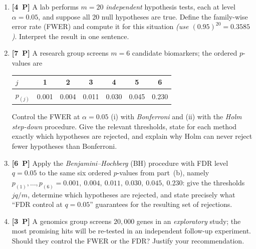 \documentclass[11pt,a4paper]{article}
\newcommand{\pp}[1]{\textbf{[#1~P]}\enspace}
\begin{document}
\begin{enumerate}[label=(\alph*),leftmargin=7mm,itemsep=2.5mm]
  \item \pp{4} A lab performs $m=20$ \emph{independent} hypothesis tests, each at level
    $\alpha=0.05$, and suppose all 20 null hypotheses are true. Define the family-wise error
    rate (FWER) and compute it for this situation
    \emph{(use $(0.95)^{20}=0.3585$)}. Interpret the result in one sentence.
  \item \pp{7} A research group screens $m=6$ candidate biomarkers; the ordered $p$-values are
    \begin{center}
    \begin{tabular}{lcccccc}
    \toprule
    $j$ & 1 & 2 & 3 & 4 & 5 & 6\\
    \midrule
    $p_{(j)}$ & 0.001 & 0.004 & 0.011 & 0.030 & 0.045 & 0.230\\
    \bottomrule
    \end{tabular}
    \end{center}
    Control the FWER at $\alpha=0.05$ (i) with \emph{Bonferroni} and (ii) with the
    \emph{Holm step-down} procedure. Give the relevant thresholds, state for each method
    exactly which hypotheses are rejected, and explain why Holm can never reject fewer
    hypotheses than Bonferroni.
  \item \pp{6} Apply the \emph{Benjamini--Hochberg} (BH) procedure with FDR level $q=0.05$ to
    the same six ordered $p$-values from part~(b), namely
    $p_{(1)},\dots,p_{(6)}=0.001,\ 0.004,\ 0.011,\ 0.030,\ 0.045,\ 0.230$:
    give the thresholds $jq/m$, determine which hypotheses are
    rejected, and state precisely what ``FDR control at $q=0.05$'' guarantees for the
    resulting set of rejections.
  \item \pp{3} A genomics group screens $20{,}000$ genes in an \emph{exploratory} study; the
    most promising hits will be re-tested in an independent follow-up experiment. Should they
    control the FWER or the FDR? Justify your recommendation.
\end{enumerate}
\end{document}
